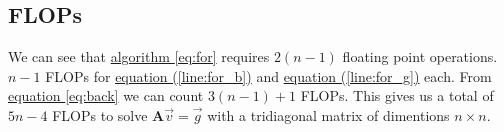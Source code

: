 \documentclass[english,notitlepage]{article}  %
\begin{document}
\subsection*{FLOPs}

We can see that \hyperref[eq:for]{algorithm \ref*{eq:for}} requires $2(n-1)$ floating point operations. $n-1$ FLOPs for \hyperref[line:for_b]{equation (\ref*{line:for_b})} and \hyperref[line:for_g]{equation (\ref*{line:for_g})} each. From \hyperref[eq:back]{equation \ref*{eq:back}} we can count $3(n-1) + 1$ FLOPs. This gives us a total of $5n - 4$ FLOPs to solve $\boldsymbol{A}\vec{v} = \vec{g}$ with a tridiagonal matrix of dimentions $n\times n$.
\end{document}
